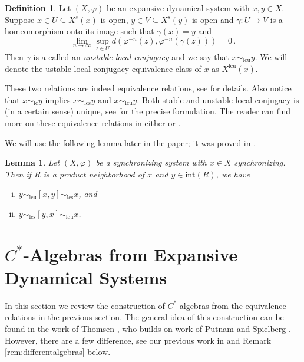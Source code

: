 \documentclass{amsart}
\newcommand{\interior}{\text{int}}
\newcommand{\lc}{\text{lc}}
\newcommand{\lcu}{\text{lcu}}
\newcommand{\lcs}{\text{lcs}}
\theoremstyle{plain}
\newtheorem{lemma}[theorem]{Lemma}
\theoremstyle{definition}
\newtheorem{definition}[theorem]{Definition}
\theoremstyle{remark}
\begin{document}
\begin{definition}
Let $(X,\varphi)$ be an expansive dynamical system with $x,y \in X$.  Suppose $x \in U \subseteq X^s(x)$ is open, $y \in V\subseteq X^s(y)$ is open and $\gamma : U \to V$ is a homeomorphism onto its image such that $\gamma(x) = y$ and \[ \lim_{n \to \infty} \sup_{z \in U} d(\varphi^{-n}(z), \varphi^{-n}(\gamma(z))) = 0 \,. \]  Then $\gamma$ is a called an \emph{unstable local conjugacy} and we say that $x \sim_\lcu y$.  We will denote the ustable local conjugacy equivalence class of $x$ as $X^\lcu(x)$.
\end{definition}

These two relations are indeed equivalence relations, see \cite{DeeSto} for details.  Also notice that $x \sim_\lc y$ implies $x \sim_\lcs y$ and $x \sim_\lcu y$. Both stable and unstable local conjugacy is (in a certain sense) unique, see \cite[Lemma 1.4]{thomsen2010c} for the precise formulation. The reader can find more on these equivalence relations in either \cite{DeeSto} or \cite{thomsen2010c}. 

We will use the following lemma later in the paper; it was proved in \cite{DeeSto}.

\begin{lemma}\label{lem:rect-nbhd-implies-lcu-lcs}
Let $(X,\varphi)$ be a synchronizing system with $x \in X$ synchronizing.  Then if $R$ is a product neighborhood of $x$ and $y \in \interior(R)$, we have
\begin{enumerate}[(i)]
    \item $y \sim_\lcu [x,y] \sim_\lcs x$, and
    \item $y \sim_\lcs [y,x] \sim_\lcu x$.
\end{enumerate}
\end{lemma}



\section{$C^\ast$-Algebras from Expansive Dynamical Systems}\label{c-star-algebras}

In this section we review the construction of $C^\ast$-algebras from the equivalence relations in the previous section. The general idea of this construction can be found in the work of Thomsen \cite{thomsen2010c}, who builds on work of Putnam and Spielberg \cite{putnam_1996, putnam99}. However, there are a few difference, see our previous work in \cite{DeeSto} and Remark \ref{rem:differentalgebras} below.  
\end{document}
